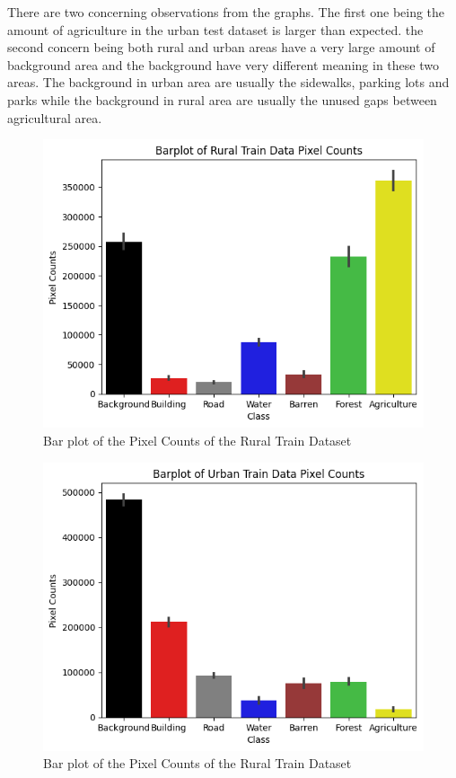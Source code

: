 There are two concerning observations from the graphs. The first one being the amount of agriculture in the urban test dataset is larger than expected. the second concern being both rural and urban areas have a very large amount of background area and the background have very different meaning in these two areas. The background in urban area are usually the sidewalks, parking lots and parks while the background in rural area are usually the unused gaps between agricultural area. 

\FloatBarrier

\begin{figure}[!h]
\includegraphics[width=15.0cm, height=8.5cm]{images/rural train barplot.png}
\centering
\caption{Bar plot of the Pixel Counts of the Rural Train Dataset}
\label{fig:barplot-rural-train}
\end{figure}


\begin{figure}[!h]
\includegraphics[width=15.0cm, height=8.5cm]{images/urban train barplot.png}
\centering
\caption{Bar plot of the Pixel Counts of the Rural Train Dataset}
\label{fig:barplot-urban-train}
\end{figure}

